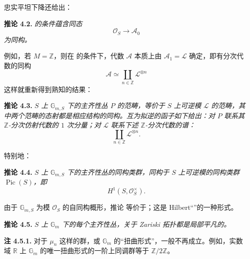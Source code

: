 忠实平坦下降还给出：

\medskip
\noindent{}\textbf{推论 4.2.}
\textit{ 的条件蕴含同态}
\[
  \mathcal O_S\longrightarrow\mathscr A_0
\]
\textit{为同构。}

例如，若 \(M=\mathbb Z\)，则在  的条件下，代数 \(\mathscr A\) 本质上由 \(\mathscr A_1=\mathscr L\) 确定，即有分次代数的同构
\[
  \mathscr A\simeq\coprod_{n\in\mathbb Z}\mathscr L^{\otimes n}
\]
这样就重新得到熟知的结果：

\medskip
\noindent{}\textbf{推论 4.3.}
\textit{\(S\) 上 \(\mathbb G_{m,S}\) 下的主齐性丛 \(P\) 的范畴，等价于 \(S\) 上可逆模 \(\mathscr L\) 的范畴，其中两个范畴的态射都是相应结构的同构。互为拟逆的函子如下给出：对 \(P\) 联系其 \(\mathbb Z\)-分次仿射代数的 \(1\) 次分量；对 \(\mathscr L\) 联系下述 \(\mathbb Z\)-分次代数的谱：}
\[
  \coprod_{n\in\mathbb Z}\mathscr L^{\otimes n}.
\]

特别地：

\medskip
\noindent{}\textbf{推论 4.4.}
\textit{\(S\) 上 \(\mathbb G_{m,S}\) 下的主齐性丛的同构类群，同构于 \(S\) 上可逆模的同构类群 \(\operatorname{Pic}(S)\)，即}
\[
  H^1(S,\mathcal O_S^\times).
\]

由于 \(\mathbb G_{m,S}\) 为模 \(\mathcal O_S\) 的自同构概形，推论  等价于；这是 Hilbert“”的一种形式。

\medskip
\noindent{}\textbf{推论 4.5.}
\textit{\(S\) 上 \(\mathbb G_m\) 下的每个主齐性丛，关于 Zariski 拓扑都是局部平凡的。}

\medskip
\noindent{}\textbf{注 4.5.1.}
对于 \(\mu_n\) 这样的群，或 \(\mathbb G_m\) 的“扭曲形式”，一般不再成立。例如，实数域 \(\mathbb R\) 上 \(\mathbb G_m\) 的唯一扭曲形式的一阶上同调群等于 \(\mathbb Z/2\mathbb Z\)。

